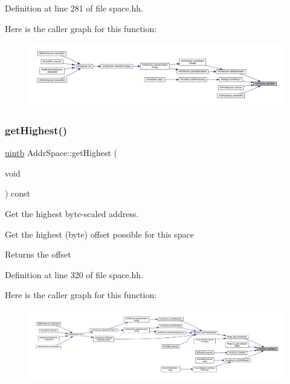Definition at line 281 of file space.\+hh.

Here is the caller graph for this function\+:
\nopagebreak
\begin{figure}[H]
\begin{center}
\leavevmode
\includegraphics[width=350pt]{class_addr_space_a63b510a07fd8450dc432d7e671f79f66_icgraph}
\end{center}
\end{figure}
\mbox{\label{class_addr_space_ab4c316eafd39b4e6c7a8017e01d5a841}} 
\subsubsection{\texorpdfstring{getHighest()}{getHighest()}}
{\footnotesize\ttfamily \mbox{\hyperlink{types_8h_a2db313c5d32a12b01d26ac9b3bca178f}{uintb}} Addr\+Space\+::get\+Highest (\begin{DoxyParamCaption}\item[{void}]{ }\end{DoxyParamCaption}) const\hspace{0.3cm}{\ttfamily [inline]}}



Get the highest byte-\/scaled address. 

Get the highest (byte) offset possible for this space \begin{DoxyReturn}{Returns}
the offset 
\end{DoxyReturn}


Definition at line 320 of file space.\+hh.

Here is the caller graph for this function\+:
\nopagebreak
\begin{figure}[H]
\begin{center}
\leavevmode
\includegraphics[width=350pt]{class_addr_space_ab4c316eafd39b4e6c7a8017e01d5a841_icgraph}
\end{center}
\end{figure}
\mbox{\label{class_addr_space_abac46fe0121579ac29f2e8e93753183d}} 
